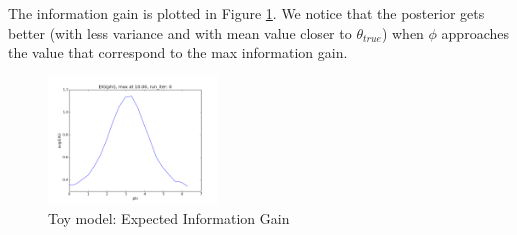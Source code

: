 \documentclass[10pt,journal,compsoc]{IEEEtran}
\begin{document}
\begin{figure}
\end{figure}
The information gain is plotted in Figure \ref{fig:EIGPlot}. We notice that the posterior gets better (with less variance and with mean value closer to $\theta_{true}$) when $\phi$ approaches the value that correspond to the max information gain.  

\begin{figure}[ht!]
 \centering
  \includegraphics[width=0.4\textwidth]{images/EIG_average.png}
  \caption{\label{fig:EIGPlot} Toy model: Expected Information Gain}
\end{figure}
\end{document}

